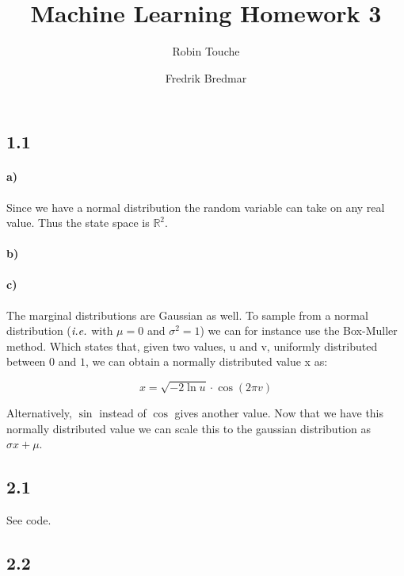 \documentclass{article}
\author{
  Robin Touche \\
  \and
  Fredrik Bredmar
}
\title{Machine Learning Homework 3}
\begin{document}
\maketitle

\subsection*{1.1}
\paragraph{a)}

Since we have a normal distribution the random variable can take on any real
value. Thus the state space is $\mathbb{R}^2$.

\paragraph{b)}


\paragraph{c)}

The marginal distributions are Gaussian as well. To sample from a normal
distribution ($\emph{i.e.}$ with $\mu = 0$ and $\sigma^2 = 1$) we can for
instance use the Box-Muller method. Which states that, given two values, u and
v, uniformly distributed between $0$ and $1$, we can obtain a normally
distributed value x as:

\begin{equation}
  x = \sqrt{-2 \ln u } \cdot \cos \left(2 \pi v \right)
\end{equation}

Alternatively, $\sin$ instead of $\cos$ gives another value. \newline
Now that we have this normally distributed value we can scale this to the
gaussian distribution as $\sigma x + \mu$.

\subsection*{2.1}

See code.

\subsection*{2.2}
\end{document}
